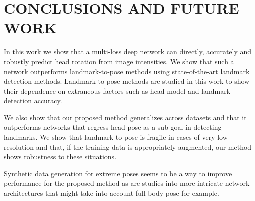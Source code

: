 \documentclass[10pt,twocolumn,letterpaper]{article}
\begin{document}
\addtolength{\textheight}{-3cm}   %

\section{CONCLUSIONS AND FUTURE WORK}\label{sec5}
In this work we show that a multi-loss deep network can directly, accurately and robustly predict head rotation from image intensities. We show that such a network outperforms landmark-to-pose methods using state-of-the-art landmark detection methods. Landmark-to-pose methods are studied in this work to show their dependence on extraneous factors such as head model and landmark detection accuracy.

We also show that our proposed method generalizes across datasets and that it outperforms networks that regress head pose as a sub-goal in detecting landmarks. We show that landmark-to-pose is fragile in cases of very low resolution and that, if the training data is appropriately augmented, our method shows robustness to these situations.

Synthetic data generation for extreme poses seems to be a way to improve performance for the proposed method as are studies into more intricate network architectures that might take into account full body pose for example.




{\small


}
\end{document}
